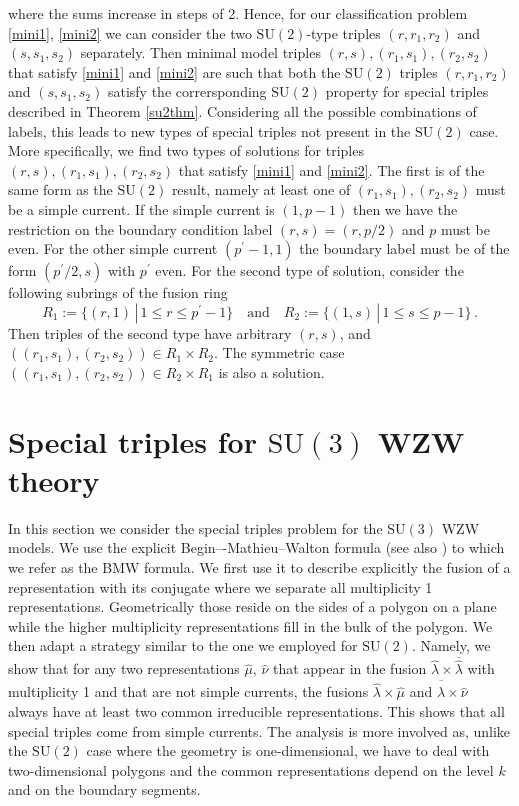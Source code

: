 \documentclass[a4paper,11pt]{article}
\theoremstyle{plain}
\theoremstyle{definition}
\begin{document}
    where the sums increase in steps of 2. Hence, for our classification problem \eqref{mini1}, \eqref{mini2} we can consider the two $\mathrm{SU}(2)$-type triples $(r,r_1,r_2)$ and $(s,s_1,s_2)$ separately. Then minimal model triples $(r,s),(r_1,s_1),(r_2,s_2)$ that satisfy \eqref{mini1} and \eqref{mini2} are such that both the $\mathrm{SU}(2)$ triples $(r,r_1,r_2)$ and $(s,s_1,s_2)$ satisfy the corrersponding $\mathrm{SU}(2)$ property for special triples described in Theorem \ref{su2thm}. Considering all the possible combinations of labels, this leads to new types of special triples not present in the $\mathrm{SU}(2)$ case.  More specifically, we find two types of solutions for triples   $(r,s),(r_1,s_1),(r_2,s_2)$ that satisfy \eqref{mini1} and \eqref{mini2}. The first is of the same form as the $\mathrm{SU}(2)$ result, namely at least one of $(r_1,s_1),(r_2,s_2)$ must be a simple current. If the simple current is $(1,p-1)$ then we have the restriction on the boundary condition label $(r,s)=(r,p/2)$ and $p$ must be even. For the other simple current $(p^\prime -1,1)$ the boundary label must be of the form $(p^\prime/2,s)$ with $p^\prime$ even. For the second type of solution, consider the following subrings of the fusion ring
     \begin{equation}
        R_1:=\{(r,1)\,|\, 1\leq r\leq p^\prime-1\} \quad \text{and}\quad R_2:=\{(1,s)\,|\, 1\leq s\leq p-1\}\,.
    \end{equation}
    Then triples of the second type have arbitrary $(r,s)$, and $\left((r_1,s_1),(r_2,s_2)\right)\in R_1\times R_2$. The symmetric case  $\left((r_1,s_1),(r_2,s_2)\right)\in R_2\times R_1$ is also a solution.



\section{Special triples for $\mathrm{SU(3)}$ WZW theory}\label{sec4}


In this section we consider the special triples  problem  for the $\mathrm{SU(3)}$ WZW models. 
We use the explicit Begin–-Mathieu--Walton formula \cite{BMW} (see also \cite{Barker}) to which we refer as the BMW formula. 
We first use it to describe explicitly the fusion of a representation with its conjugate where we separate all multiplicity 1 representations. 
Geometrically those reside on the sides of a polygon on a plane while the higher multiplicity representations fill in the bulk of the polygon. 
We then adapt a strategy similar to the one we employed for $\mathrm{SU(2)}$. Namely, we show that for any two representations $\hat \mu$, $\hat \nu$
that appear in the fusion $\hat \lambda \times \overline{\hat \lambda}$ with multiplicity 1 and that are not simple currents, the fusions $\hat \lambda \times \hat \mu$ and $\overline{ \hat \lambda} \times \hat \nu$ always have at least two common irreducible representations.   This shows that all special triples come from simple currents. The analysis is more involved as, unlike  the 
$\mathrm{SU(2)}$ case where the geometry is one-dimensional, we have to deal with two-dimensional polygons and the common representations depend on the level $k$ and on the boundary segments. 
\end{document}
